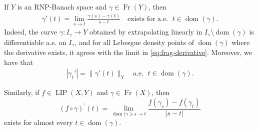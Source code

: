 \documentclass{amsart}
\numberwithin{equation}{section}
\newcommand{\LIP}{\operatorname{LIP}}
\newcommand{\dom}{\operatorname{dom}}
\newcommand{\Fr}{\operatorname{Fr}}
\begin{document}
If $Y$ is an RNP-Banach space and $\gamma\in\Fr(Y)$, then 
\begin{align}\label{eq:frag-derivative}
\gamma'(t)=\lim_{s\to t}\frac{\gamma(s)-\gamma(t)}{s-t}\quad\mbox{exists for a.e. }\; t\in \dom(\gamma).
\end{align}
Indeed, the curve $\gamma:I_\gamma\to Y$ obtained by extrapolating linearly in $I_\gamma\setminus\dom(\gamma)$ is differentiable a.e. on $I_\gamma$, and for all 
Lebesgue density points of $\dom(\gamma)$ where the derivative exists, it agrees with the limit in \eqref{eq:frag-derivative}.  
Moreover, we have that
\begin{align*}
    |\gamma_t'|=\|\gamma'(t)\|_Y\quad\mbox{a.e. }\;t\in \dom(\gamma).
\end{align*}

Similarly, if $f\in\LIP(X,Y)$ and $\gamma\in \Fr(X)$, then 
\begin{equation}\label{eq:diffcomposition}
(f\circ\gamma )^\prime (t)=\lim_{\dom (\gamma \ni s\to t}\frac{f(\gamma_s)-f(\gamma_t)}{|s-t|}
\end{equation}
exists for almost every $t\in\dom (\gamma )$.
\end{document}
